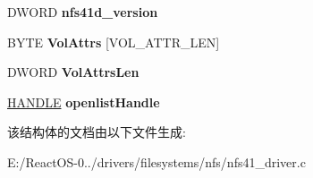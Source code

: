 \begin{DoxyCompactItemize}
D\+W\+O\+RD {\bfseries nfs41d\+\_\+version}
\item 
\mbox{\label{struct___n_f_s41___d_e_v_i_c_e___e_x_t_e_n_s_i_o_n_a7ff4fe0fb99f583207fe1aa67d152969}} 
B\+Y\+TE {\bfseries Vol\+Attrs} \mbox{[}V\+O\+L\+\_\+\+A\+T\+T\+R\+\_\+\+L\+EN\mbox{]}
\item 
\mbox{\label{struct___n_f_s41___d_e_v_i_c_e___e_x_t_e_n_s_i_o_n_a7230fcd6e3c3b728007ebaafb6507599}} 
D\+W\+O\+RD {\bfseries Vol\+Attrs\+Len}
\item 
\mbox{\label{struct___n_f_s41___d_e_v_i_c_e___e_x_t_e_n_s_i_o_n_a81239b600e60369f71d466c4c8ffbd43}} 
\hyperlink{interfacevoid}{H\+A\+N\+D\+LE} {\bfseries openlist\+Handle}
\end{DoxyCompactItemize}


该结构体的文档由以下文件生成\+:\begin{DoxyCompactItemize}
\item 
E\+:/\+React\+O\+S-\/0../drivers/filesystems/nfs/nfs41\+\_\+driver.\+c\end{DoxyCompactItemize}
